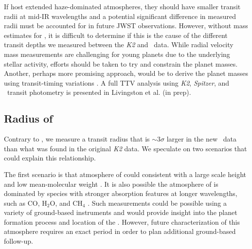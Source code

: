 \documentclass[twocolumn]{aastex631}
\begin{document}
If \planetknown host extended haze-dominated atmospheres, they should have smaller transit radii at mid-IR wavelengths \citep{gao20} and a potential significant difference in measured radii must be accounted for in future JWST observations. However, without mass estimates for \planetknown, it is difficult to determine if this is the cause of the different transit depths we measured between the \textit{K2} and \tess\ data. While radial velocity mass measurements are challenging for young planets due to the underlying stellar activity, efforts should be taken to try and constrain the planet masses. Another, perhaps more promising approach, would be to derive the planet masses using transit-timing variations \citep[TTVs;][]{agol18}. A full TTV analysis using \textit{K2}, \textit{Spitzer}, and \tess\ transit photometry is presented in Livingston et al. (in prep). 

\subsection{Radius of \planete}

Contrary to \planetknown, we measure a transit radius that is $\sim 3\sigma$ larger in the new \tess\ data than what was found in the original \textit{K2} data. We speculate on two scenarios that could explain this relationship.

The first scenario is that atmosphere of \planete could consistent with a large scale height and low mean-molecular weight \citep{deMooij12}. It is also possible the atmosphere of \planete is dominated by species with stronger absorption features at longer wavelengths, such as CO, H$_2$O, and CH$_4$ \citep{carter09}. Such measurements could be possible using a variety of ground-based instruments \citep[e.g.][]{line21} and would provide insight into the planet formation process and location of the \planete. However, future characterization of this atmosphere requires an exact period in order to plan additional ground-based follow-up.
\end{document}
